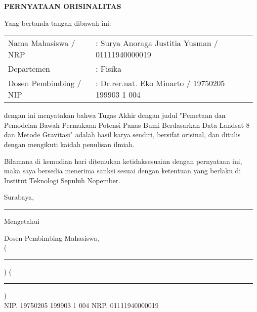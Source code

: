 \newpage
\begin{center}
    \textbf{PERNYATAAN ORISINALITAS}
\end{center}

\vskip20pt
Yang bertanda tangan dibawah ini:
\vskip15pt

\begin{tabular}[h]{ll}
    Nama Mahasiswa / NRP &: Surya Anoraga Justitia Yusman / 01111940000019\\
    Departemen &: Fisika\\
    Dosen Pembimbing / NIP &: Dr.rer.nat. Eko Minarto / 19750205 199903 1 004\\
\end{tabular}

\vskip20pt

dengan ini menyatakan bahwa Tugas Akhir dengan judul "Pemetaan dan Pemodelan Bawah Permukaan Potensi Panas Bumi Berdasarkan Data Landsat 8 dan Metode Gravitasi" adalah hasil karya sendiri, bersifat orisinal, dan ditulis dengan mengikuti kaidah penulisan ilmiah.

Bilamana di kemudian hari ditemukan ketidaksesuaian dengan pernyataan ini, maka saya bersedia menerima sanksi sesuai dengan ketentuan yang berlaku di Institut Teknologi Sepuluh Nopember.


\hfill Surabaya,\rule{3cm}{0.2pt}

Mengetahui
\vskip 3pt

Dosen Pembimbing \hspace{5cm} Mahasiswa,\\
\vskip2cm
(\rule{5cm}{0.2pt}) \hspace{3.2cm} (\rule{5cm}{0.2pt}) \\
NIP. 19750205 199903 1 004 \hspace{3.5cm} NRP. 01111940000019\\
\restoregeometry